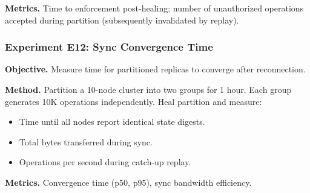 \textbf{Metrics.} Time to enforcement post-healing; number of unauthorized operations accepted during partition (subsequently invalidated by replay).



\subsubsection{Experiment E12: Sync Convergence Time}
\textbf{Objective.} Measure time for partitioned replicas to converge after reconnection.

\textbf{Method.} Partition a 10-node cluster into two groups for 1 hour. Each group generates 10K operations independently. Heal partition and measure:
\begin{itemize}
    \item Time until all nodes report identical state digests.
    \item Total bytes transferred during sync.
    \item Operations per second during catch-up replay.
\end{itemize}

\textbf{Metrics.} Convergence time (p50, p95), sync bandwidth efficiency.


